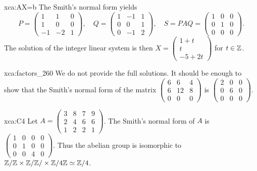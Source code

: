 \begin{sol}{xca:AX=b}
	The Smith's normal form yields 
	\[
		P=\begin{pmatrix}
			1 & 1 & 0\\
			1 & 0 & 0\\
			-1 & -2 & 1
		\end{pmatrix},
		\quad
		Q=\begin{pmatrix}
			1 & -1 & 1\\
			0 & 0 & 1\\
			0 & -1 & 2
		\end{pmatrix},\quad
		S=PAQ=\begin{pmatrix}
			1 & 0 & 0\\
			0 & 1 & 0\\
			0 & 0 & 0
		\end{pmatrix}.
	\]
	The solution of the integer linear system is then
	$X=\begin{pmatrix}
		1 + t\\
		t\\
		-5+2t
	\end{pmatrix}$ for $t\in\mathbb{Z}$. 
\end{sol}

\begin{sol}{xca:factors_260}
	We do not provide the full solutions. It should be enough to
	show that the Smith's normal form
	of the matrix $\begin{pmatrix}
		6 & 6 & 4\\
		6 & 12 & 8\\
		0 & 0 & 0
	\end{pmatrix}$ is $\begin{pmatrix}
		2 & 0 & 0\\
		0 & 6 & 0\\
		0 & 0 & 0
	\end{pmatrix}$. 
\end{sol}

\begin{sol}{xca:C4}
    Let $A=\begin{pmatrix}
    3 & 8 & 7 & 9\\
    2 & 4 & 6 & 6\\
    1 & 2 & 2 & 1
    \end{pmatrix}$.  
    The Smith's normal form of $A$  
    is $\begin{pmatrix}
        1 & 0 & 0 & 0\\
        0 & 1 & 0 & 0\\
        0 & 0 & 4 & 0
    \end{pmatrix}$. Thus the abelian group is isomorphic to $\mathbb{Z}/\mathbb{Z}\times\mathbb{Z}/\mathbb{Z}/\times\mathbb{Z}/4\mathbb{Z}\simeq\mathbb{Z}/4$.  
\end{sol}

